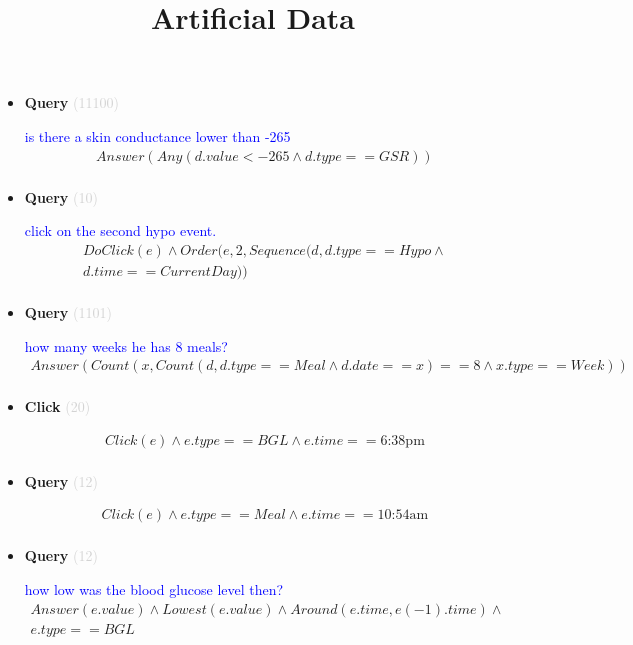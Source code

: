 \documentclass[11pt]{article}
\newcommand{\key}[1]{\textcolor{lightgray}{#1}}
\newcounter{CQuery}
\newcounter{CStatement}
\newcounter{CClick}
\begin{document}
\date{}
\title{Artificial Data}
\maketitle

\setcounter{CQuery}{1}
\setcounter{CStatement}{1}
\setcounter{CClick}{1}

\begin{itemize}
\item
\textbf{Query\theCQuery} \key{(11100)} \addtocounter{CQuery}{1}
\textcolor{blue}{ is there a skin conductance lower than -265 }
\begin{multline*}
Answer(Any(d.value<-265 \wedge d.type==GSR)) \\ 
\end{multline*}


\item
\textbf{Query\theCQuery} \key{(10)} \addtocounter{CQuery}{1}
\textcolor{blue}{ click on the second hypo event. }
\begin{multline*}
DoClick(e) \wedge  Order(e, 2, Sequence(d, d.type==Hypo \wedge \\ 
d.time==CurrentDay)) \\ 
\end{multline*}


\item
\textbf{Query\theCQuery} \key{(1101)} \addtocounter{CQuery}{1}
\textcolor{blue}{ how many weeks he has 8 meals? }
\begin{multline*}
Answer(Count(x, Count(d, d.type==Meal \wedge d.date==x)==8 \wedge x.type==Week)) \\ 
\end{multline*}


\item
\textbf{Click\theCClick} \key{(20)} \addtocounter{CClick}{1}
\textcolor{blue}{  }
\begin{multline*}
Click(e) \wedge e.type==BGL \wedge e.time==\mbox{6:38pm} \\ 
\end{multline*}


\item
\textbf{Query\theCQuery} \key{(12)} \addtocounter{CQuery}{1}
\textcolor{blue}{  }
\begin{multline*}
Click(e) \wedge e.type == Meal \wedge e.time==\mbox{10:54am} \\ 
\end{multline*}


\item
\textbf{Query\theCQuery} \key{(12)} \addtocounter{CQuery}{1}
\textcolor{blue}{ how low was the blood glucose level then? }
\begin{multline*}
Answer(e.value) \wedge Lowest(e.value) \wedge Around(e.time, e(-1).time) \wedge \\ 
e.type==BGL \\ 
\end{multline*}



\end{itemize}
\end{document}
